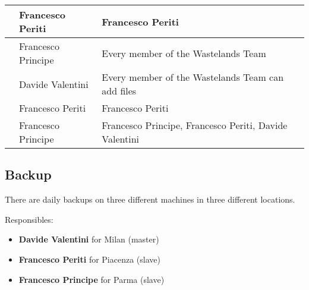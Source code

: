 \begin{longtable}[H]
{\begin{tabular}{|p{12.6cm}|p{3.3cm}|p{3.3cm}|}
\path{./Documents/DataManagmentDocument/*} & Francesco Periti & Francesco Periti \\ \hline
\path{./Documents/*.tex} & Francesco Principe & Every member of the Wastelands Team \\ \hline
\path{./References/*} & Davide Valentini & Every member of the Wastelands Team can add files \\ \hline
\path{./Logos/*} & Francesco Periti & Francesco Periti \\ \hline
\path{./*} & Francesco Principe & Francesco Principe, Francesco Periti, Davide Valentini \\ \hline
\end{tabular}}
\end{longtable}

\subsection{Backup}
There are daily backups on three different machines in three different locations.

Responsibles:
\begin{itemize}
	\item \textbf{Davide Valentini} for Milan (master)
	\item \textbf{Francesco Periti} for Piacenza (slave)
	\item \textbf{Francesco Principe} for Parma (slave)
\end{itemize}
